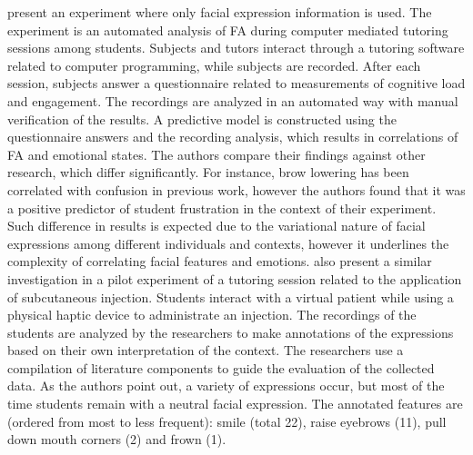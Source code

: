 \textcite{grafsgaard2013automatically} present an experiment where only facial expression information is used. The experiment is an automated analysis of FA during computer mediated tutoring sessions among students. Subjects and tutors interact through a tutoring software related to computer programming, while subjects are recorded. After each session, subjects answer a questionnaire related to measurements of cognitive load and engagement. The recordings are analyzed in an automated way with manual verification of the results. A predictive model is constructed using the questionnaire answers and the recording analysis, which results in correlations of FA and emotional states. The authors compare their findings against other research, which differ significantly. For instance, brow lowering has been correlated with confusion in previous work, however the authors found that it was a positive predictor of student frustration in the context of their experiment. Such difference in results is expected due to the variational nature of facial expressions among different individuals and contexts, however it underlines the complexity of correlating facial features and emotions. \textcite{heylen2005facial} also present a similar investigation in a pilot experiment of a tutoring session related to the application of subcutaneous injection. Students interact with a virtual patient while using a physical haptic device to administrate an injection. The recordings of the students are analyzed by the researchers to make annotations of the expressions based on their own interpretation of the context. The researchers use a compilation of literature components to guide the evaluation of the collected data. As the authors point out, a variety of expressions occur, but most of the time students remain with a neutral facial expression. The annotated features are (ordered from most to less frequent): smile (total 22), raise eyebrows (11), pull down mouth corners (2) and frown (1).


